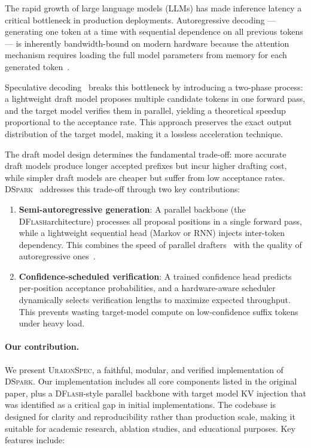 \documentclass[11pt,a4paper]{article}
\newcommand{\UraionSpec}{\textsc{UraionSpec}}
\newcommand{\DSpark}{\textsc{DSpark}}
\newcommand{\DFlash}{\textsc{DFlash}}
\begin{document}
The rapid growth of large language models (LLMs) has made inference latency a
critical bottleneck in production deployments. Autoregressive decoding ---
generating one token at a time with sequential dependence on all previous
tokens --- is inherently bandwidth-bound on modern hardware because the
attention mechanism requires loading the full model parameters from memory
for each generated token~\cite{pope2023efficiently, leviathan2023fast}.

Speculative decoding~\cite{leviathan2023fast, chen2023accelerating} breaks
this bottleneck by introducing a two-phase process: a lightweight draft model
proposes multiple candidate tokens in one forward pass, and the target model
verifies them in parallel, yielding a theoretical speedup proportional to the
acceptance rate. This approach preserves the exact output distribution of the
target model, making it a lossless acceleration technique.

The draft model design determines the fundamental trade-off: more accurate
draft models produce longer accepted prefixes but incur higher drafting cost,
while simpler draft models are cheaper but suffer from low acceptance rates.
\DSpark~\cite{cheng2026dspark} addresses this trade-off through two key
contributions:

\begin{enumerate}
  \item \textbf{Semi-autoregressive generation}: A parallel backbone
    (the \DFlash architecture) processes all proposal positions in a
    single forward pass, while a lightweight sequential head (Markov or RNN)
    injects inter-token dependency. This combines the speed of parallel
    drafters~\cite{stern2018blockwise, xia2022medusa} with the quality of
    autoregressive ones~\cite{miao2025eagle3}.
  \item \textbf{Confidence-scheduled verification}: A trained confidence head
    predicts per-position acceptance probabilities, and a hardware-aware
    scheduler dynamically selects verification lengths to maximize expected
    throughput. This prevents wasting target-model compute on low-confidence
    suffix tokens under heavy load.
\end{enumerate}

\paragraph{Our contribution.}
We present \UraionSpec, a faithful, modular, and verified implementation of
\DSpark. Our implementation includes all core components listed in the
original paper, plus a \DFlash-style parallel backbone with target model KV
injection that was identified as a critical gap in initial implementations.
The codebase is designed for clarity and reproducibility rather than
production scale, making it suitable for academic research, ablation studies,
and educational purposes. Key features include:
\end{document}
